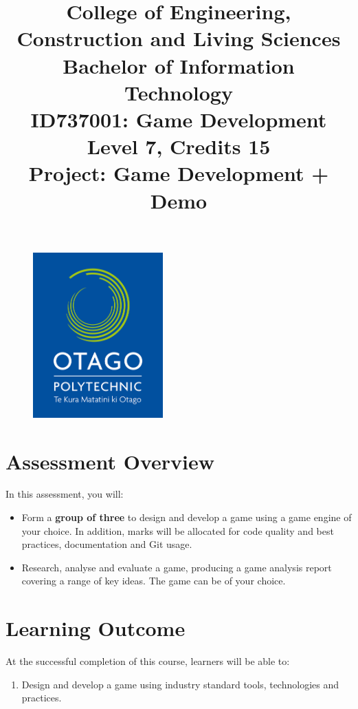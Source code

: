 \documentclass{article}
\author{}
\begin{document}
\begin{figure}
	\centering
	\includegraphics[width=50mm]{../../resources/img/logo.jpg}
\end{figure}

\title{College of Engineering, Construction and Living Sciences\\Bachelor of Information Technology\\ID737001: Game Development\\Level 7, Credits 15\\\textbf{Project: Game Development + Demo}}
\date{}
\maketitle

\section*{Assessment Overview}
In this assessment, you will:
\begin{itemize}
	\item Form a \textbf{group of three} to design and develop a game using a game engine of your choice. In addition, marks will be allocated for code quality and best practices, documentation and Git usage.
	\item Research, analyse and evaluate a game, producing a game analysis report covering a range of key ideas. The game can be of your choice. 
\end{itemize}

\section*{Learning Outcome}
At the successful completion of this course, learners will be able to:
\begin{enumerate}
	\item Design and develop a game using industry standard tools, technologies and practices.
\end{enumerate}
\end{document}
